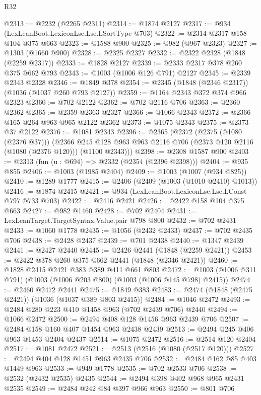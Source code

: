 \begin{lexlean}{R32}
\begin{coremodule}
@2313 := @2232 (@2265 @2311)
@2314 := @1874 @2127
@2317 := @934 (LexLeanBoot.LexiconLse.Lse.LSortType @703)
@2322 := @2314 @2317 @158 @104 @375 @663
@2323 := @1588 @900
@2325 := @982 (@967 @2323)
@2327 := @1303 (@1660 @900)
@2328 := @2325 @2327
@2332 := @2322 @2328 (@1848 (@2259 @2317))
@2333 := @1828 @2127
@2339 := @2333 @2317 @378 @260 @375 @662 @793
@2343 := @1003 (@1006 @126 @791) @2127
@2345 := @2339 @2343 @2328
@2346 := @1849 @378
@2354 := @2345 (@1848 (@2346 @2317)) (@1036 (@1037 @260 @793 @2127))
@2359 := @1164 @2343 @372 @374 @966 @2323
@2360 := @702 @2122
@2362 := @702 @2116 @706
@2363 := @2360 @2362
@2365 := @2359 @2363 @2327
@2366 := @1066 @2343
@2372 := @2366 @165 @264 @963 @965 @2122 @2362
@2373 := @1075 @2343
@2375 := @2373 @37 @2122
@2376 := @1081 @2343
@2396 := @2365
    (@2372
      (@2375 (@1080 (@2376 @37)))
      (@2366 @245 @128 @963 @963 @2116 @706 (@2373 @120 @2116 (@1080 (@2376 @120))) (@1100 @2343)))
@2398 := @2308 @1587 @900
@2403 := @2313 (fun (u : @694) => @2332 (@2354 (@2396 @2398)))
@2404 := @935 @855
@2406 := @1003 (@1985 @2404)
@2409 := @1003 (@1007 (@934 @825))
@2410 := @1289 @1777
@2415 := @2406 (@2409 (@1003 (@1010 @2410) @1013))
@2416 := @1874 @2415
@2421 := @934 (LexLeanBoot.LexiconLse.Lse.LConst @797 @733 @703)
@2422 := @2416 @2421
@2426 := @2422 @158 @104 @375 @663
@2427 := @982 @1460
@2428 := @702 @2404
@2431 := LexLeanTarget.TargetSyntax.Value.pair @798 @800
@2432 := @702 @2431
@2433 := @1060 @1778
@2435 := @1056 (@2432 @2433)
@2437 := @702 @2435 @706
@2438 := @2428 @2437
@2439 := @701 @2438
@2440 := @1347 @2439
@2441 := @2427 @2440
@2445 := @2426 @2441 (@1848 (@2259 @2421))
@2453 := @2422 @378 @260 @375 @662 @2441 (@1848 (@2346 @2421))
@2460 := @1828 @2415 @2421 @383 @389 @411 @661 @803
@2472 := @1003 (@1006 @311 @791) (@1003 (@1006 @203 @800) (@1003 (@1006 @145 @798) @2415))
@2474 := @2460 @2472 @2441
@2475 := @1849 @383
@2483 := @2474 (@1848 (@2475 @2421)) (@1036 (@1037 @389 @803 @2415))
@2484 := @1046 @2472
@2493 := @2484 @280 @223 @410 @1458 @963 (@702 @2439 @706) @2440
@2494 := @1066 @2472
@2500 := @2494 @408 @128 @1456 @963 @2439 @706
@2507 := @2484 @158 @160 @407 @1454 @963 @2438 @2439
@2513 := @2494 @245 @406 @963 @1453 @2404 @2437
@2514 := @1075 @2472
@2516 := @2514 @120 @2404
@2517 := @1081 @2472
@2521 := @2513 (@2516 (@1080 (@2517 @120)))
@2527 := @2494 @404 @128 @1451 @963 @2435 @706
@2532 := @2484 @162 @85 @403 @1449 @963
@2533 := @949 @1778
@2535 := @702 @2533 @706
@2538 := @2532 (@2432 @2535) @2435
@2544 := @2494 @398 @402 @968 @965 @2431 @2535
@2549 := @2484 @242 @84 @397 @966 @963
@2550 := @801 @706

\end{coremodule}
\end{lexlean}
